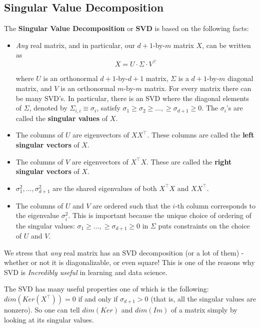 \documentclass[11pt]{article}
\newcommand{\Tr}{\ensuremath{\top}}
\begin{document}
\subsection{Singular Value Decomposition}

The \textbf{Singular Value Decomposition} or \textbf{SVD} is based on the following facts:

\begin{itemize}
  \item \textit{Any} real matrix, and in particular, our $d+1$-by-$m$ matrix $X$, can be written as
    \[
  X=U\cdot \Sigma \cdot V^\Tr
    \]

where $U$ is an orthonormal $d+1$-by-$d+1$ matrix, $\Sigma$ is a $d+1$-by-$m$ diagonal matrix, and $V$ is an orthonormal $m$-by-$m$ matrix.
For every matrix there can be many SVD's. In particular, there is an SVD where the diagonal elements of $\Sigma$,  denoted by $\Sigma_{i,i}\equiv \sigma_i$, satisfy  $\sigma_1\geq \sigma_2\geq \ldots,\geq \sigma_{d+1}\geq 0$. The $\sigma_i$'s are called the \textbf{singular values} of $X$.

  \item The columns of $U$ are eigenvectors of $XX^\Tr$. These columns are called the \textbf{left singular vectors} of $X$.
  \item The columns of $V$ are eigenvectors of $X^\Tr X$. These are called the \textbf{right singular vectors} of $X$.
  \item $\sigma_1^2,\ldots,\sigma_{d+1}^2$ are the shared eigenvalues of both $X^\Tr X$ and $XX^\Tr$.
  \item The columns of $U$ and $V$ are ordered such that the $i$-th column corresponds to the eigenvalue $\sigma_i^2$.
  This is important because the unique choice of ordering of the singular values: $\sigma_1\geq \ldots,\geq \sigma_{d+1}\geq 0$  in $\Sigma$ puts constraints on the choice of $U$ and $V$.

\end{itemize}

We stress that \textit{any} real matrix has an SVD decomposition (or a lot of them) - whether or not it is diagonalizable, or even square! This is one of the reasons why SVD is \textit{Incredibly useful} in learning and data science.

The SVD has many useful properties one of which is the following: $dim(Ker(X^\Tr))=0$ if and only if $\sigma_{d+1}>0$ (that is, all the singular values are nonzero).
So one can tell $dim(Ker)$ and $dim(Im)$ of a matrix simply by looking at its singular values.
\end{document}
